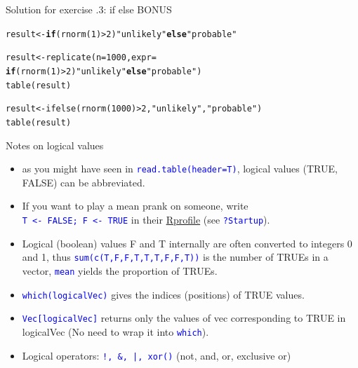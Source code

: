 \documentclass[xcolor=table,      handout ,    xcolor=dvipsnames]{beamer}\usepackage[]{graphicx}\usepackage[]{color}
\makeatletter
\newcommand{\hlnum}[1]{\textcolor[rgb]{0,0,0}{#1}}
\newcommand{\hlstr}[1]{\textcolor[rgb]{0.545,0.137,0.137}{#1}}
\newcommand{\hlopt}[1]{\textcolor[rgb]{0,0,0}{#1}}
\newcommand{\hlstd}[1]{\textcolor[rgb]{0,0,0}{#1}}
\newcommand{\hlkwa}[1]{\textcolor[rgb]{1,0,0}{\textbf{#1}}}
\newcommand{\hlkwb}[1]{\textcolor[rgb]{0,0,0}{#1}}
\newcommand{\hlkwc}[1]{\textcolor[rgb]{1,0,1}{#1}}
\newcommand{\hlkwd}[1]{\textcolor[rgb]{0,0,1}{#1}}
\newenvironment{kframe}{%
 \def\at@end@of@kframe{}%
 \ifinner\ifhmode%
  \def\at@end@of@kframe{\end{minipage}}%
  \begin{minipage}{\columnwidth}%
 \fi\fi%
 \def\FrameCommand##1{\hskip\@totalleftmargin \hskip-\fboxsep
 \colorbox{shadecolor}{##1}\hskip-\fboxsep
     \hskip-\linewidth \hskip-\@totalleftmargin \hskip\columnwidth}%
 \MakeFramed {\advance\hsize-\width
   \@totalleftmargin\z@ \linewidth\hsize
   \@setminipage}}%
 {\par\unskip\endMakeFramed%
 \at@end@of@kframe}
\newenvironment{knitrout}{}{} %
\newcounter{exercisecount}
\newcommand{\rcode}[1]{\texttt{\textcolor{Blue}{#1}}}
\makeatother
\begin{document}

\begin{frame}[fragile]{Solution for exercise .3: if else BONUS}
\begin{knitrout}
\color{fgcolor}\begin{kframe}
\begin{alltt}
\hlstd{result} \hlkwb{<-} \hlkwa{if}\hlstd{(}\hlkwd{rnorm}\hlstd{(}\hlnum{1}\hlstd{)}\hlopt{>}\hlnum{2}\hlstd{)} \hlstr{"unlikely"} \hlkwa{else} \hlstr{"probable"}

\hlstd{result} \hlkwb{<-} \hlkwd{replicate}\hlstd{(}\hlkwc{n}\hlstd{=}\hlnum{1000}\hlstd{,} \hlkwc{expr}\hlstd{=}
             \hlkwa{if}\hlstd{(}\hlkwd{rnorm}\hlstd{(}\hlnum{1}\hlstd{)}\hlopt{>}\hlnum{2}\hlstd{)} \hlstr{"unlikely"} \hlkwa{else} \hlstr{"probable"}\hlstd{)}
\hlkwd{table}\hlstd{(result)}

\hlstd{result} \hlkwb{<-} \hlkwd{ifelse}\hlstd{(}\hlkwd{rnorm}\hlstd{(}\hlnum{1000}\hlstd{)}\hlopt{>}\hlnum{2}\hlstd{,} \hlstr{"unlikely"}\hlstd{,} \hlstr{"probable"}\hlstd{)}
\hlkwd{table}\hlstd{(result)}
\end{alltt}
\end{kframe}
\end{knitrout}
\end{frame}


\begin{frame}[fragile]{Notes on logical values}
\begin{itemize}[<+->]
\item as you might have seen in \rcode{read.table(header=T)}, logical values (TRUE, FALSE) can be abbreviated.
\item If you want to play a mean prank on someone, write\\ \rcode{T <- FALSE; F <- TRUE} in their \href{https://rclickhandbuch.wordpress.com/install-r/rprofile/}{Rprofile} (see \rcode{?Startup}).
\item Logical (boolean) values F and T internally are often converted to integers 0 and 1, thus \rcode{sum(c(T,F,F,T,T,T,F,F,T))} is the number of TRUEs in a vector, \rcode{mean} yields the proportion of TRUEs.
\item \rcode{which(logicalVec)} gives the indices (positions) of TRUE values.
\item \rcode{Vec[logicalVec]} returns only the values of vec corresponding to TRUE in logicalVec (No need to wrap it into \rcode{which}).
\item Logical operators: \rcode{!, \&, |, xor()} (not, and, or, exclusive or)
\end{itemize}
\end{frame}
\end{document}
